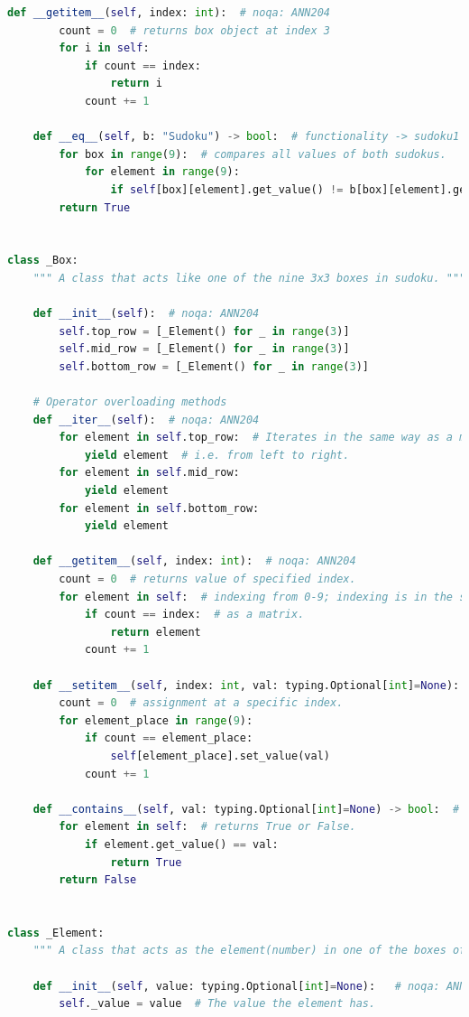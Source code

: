 \documentclass[12pt, a4paper]{report}
\begin{document}
\begin{lstlisting}[language=Python, caption=utils/classes.py]
    def __getitem__(self, index: int):  # noqa: ANN204
        count = 0  # returns box object at index 3
        for i in self:
            if count == index:
                return i
            count += 1

    def __eq__(self, b: "Sudoku") -> bool:  # functionality -> sudoku1 == sudoku2
        for box in range(9):  # compares all values of both sudokus.
            for element in range(9):
                if self[box][element].get_value() != b[box][element].get_value(): return False
        return True


class _Box:
    """ A class that acts like one of the nine 3x3 boxes in sudoku. """

    def __init__(self):  # noqa: ANN204
        self.top_row = [_Element() for _ in range(3)]
        self.mid_row = [_Element() for _ in range(3)]
        self.bottom_row = [_Element() for _ in range(3)]

    # Operator overloading methods
    def __iter__(self):  # noqa: ANN204
        for element in self.top_row:  # Iterates in the same way as a matrix
            yield element  # i.e. from left to right.
        for element in self.mid_row:
            yield element
        for element in self.bottom_row:
            yield element

    def __getitem__(self, index: int):  # noqa: ANN204
        count = 0  # returns value of specified index.
        for element in self:  # indexing from 0-9; indexing is in the same way
            if count == index:  # as a matrix.
                return element
            count += 1

    def __setitem__(self, index: int, val: typing.Optional[int]=None):  # noqa: ANN204
        count = 0  # assignment at a specific index.
        for element_place in range(9):
            if count == element_place:
                self[element_place].set_value(val)
            count += 1

    def __contains__(self, val: typing.Optional[int]=None) -> bool:  # functionality -> val in box
        for element in self:  # returns True or False.
            if element.get_value() == val:
                return True
        return False


class _Element:
    """ A class that acts as the element(number) in one of the boxes of sudoku. """

    def __init__(self, value: typing.Optional[int]=None):   # noqa: ANN204
        self._value = value  # The value the element has.


\end{lstlisting}
\end{document}

